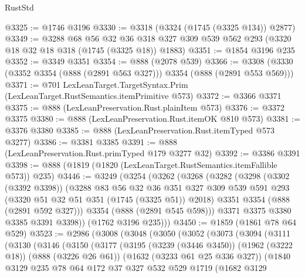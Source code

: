 \begin{lexlean}{RustStd}
\begin{coremodule}
@3325 := @1746 @3196
@3330 := @3318 (@3324 (@1745 (@3325 @134)) @2877)
@3349 := @3288
    @68
    @56
    @32
    @36
    @318
    @327
    @309
    @539
    @562
    @293
    (@3320 @18 @32 @18 @318 (@1745 (@3325 @18)) @1883)
@3351 := @1854 @3196 @235
@3352 := @3349 @3351
@3354 := @888 (@2078 @539)
@3366 := @3308 (@3330 (@3352 @3354 (@888 (@2891 @563 @327))) @3354 (@888 (@2891 @553 @569)))
@3371 := @701 LexLeanTarget.TargetSyntax.Prim (LexLeanTarget.RustSemantics.itemPrimitive @573)
@3372 := @3366 @3371
@3375 := @888 (LexLeanPreservation.Rust.plainItem @573)
@3376 := @3372 @3375
@3380 := @888 (LexLeanPreservation.Rust.itemOK @810 @573)
@3381 := @3376 @3380
@3385 := @888 (LexLeanPreservation.Rust.itemTyped @573 @3277)
@3386 := @3381 @3385
@3391 := @888 (LexLeanPreservation.Rust.primTyped @179 @3277 @32)
@3392 := @3386 @3391
@3398 := @888 (@1819 (@1820 (LexLeanTarget.RustSemantics.itemFallible @573)) @235)
@3446 := @3249
    (@3254
      (@3262
        (@3268
          (@3282
            (@3298
              (@3302 (@3392 @3398))
              (@3288
                @83
                @56
                @32
                @36
                @351
                @327
                @309
                @539
                @591
                @293
                (@3320 @51 @32 @51 @351 (@1745 (@3325 @51)) @2018)
                @3351
                @3354
                (@888 (@2891 @592 @327)))
              @3354
              (@888 (@2891 @545 @598)))
            @3371
            @3375
            @3380
            @3385
            @3391
            @3398))
        (@1762 @3196 @235)))
@3450 := @1859 (@1861 @78 @64 @529)
@3523 := @2986
    (@3008
      (@3048
        (@3050
          (@3052
            (@3073
              (@3094
                (@3111
                  (@3130
                    (@3146
                      (@3150
                        (@3177
                          (@3195
                            (@3239 (@3446 @3450))
                            (@1962 (@3222 @18))
                            (@888 (@3226 @26 @61))
                            (@1632 (@3233 @61 @25 @336 @327))
                            (@1840
                              @3129
                              @235
                              @78
                              @64
                              @172
                              @37
                              @327
                              @532
                              @529
                              @1719
                              (@1682
                                @3129

\end{coremodule}
\end{lexlean}
